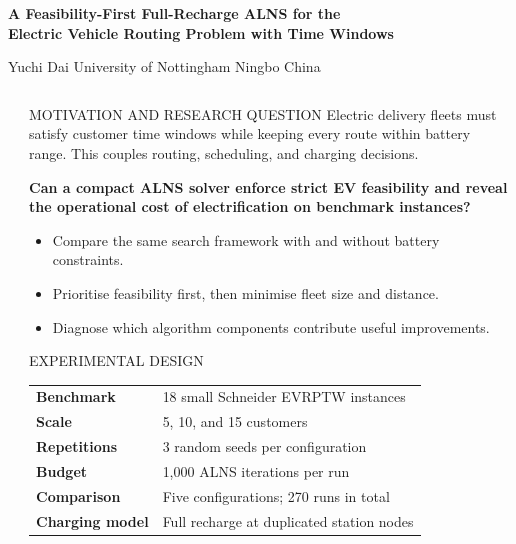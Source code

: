 \documentclass[final]{beamer}
\title{}
\author{}
\institute[]{}
\newlength{\sepwidth}
\newlength{\colwidth}
\newcommand{\separatorcolumn}{\begin{column}{\sepwidth}\end{column}}
\begin{document}
\begin{frame}[t]

{\centering
  \vspace{0.55cm}
  {\fontsize{50}{58}\selectfont\bfseries\color{nottblue}
  A Feasibility-First Full-Recharge ALNS for the\\
  Electric Vehicle Routing Problem with Time Windows\par}
  \vspace{0.35cm}
  {\fontsize{25}{31}\selectfont Yuchi Dai \quad\textbullet\quad University of Nottingham Ningbo China\par}
  \vspace{0.7cm}
}

\begin{columns}[t,totalwidth=\paperwidth]
\separatorcolumn

\begin{column}{\colwidth}

\begin{posterbox}{MOTIVATION AND RESEARCH QUESTION}
\fontsize{25}{32}\selectfont
Electric delivery fleets must satisfy customer time windows while keeping every route within battery range. This couples routing, scheduling, and charging decisions.

\vspace{0.3cm}
\begin{takeaway}
\centering\bfseries
Can a compact ALNS solver enforce strict EV feasibility and reveal the operational cost of electrification on benchmark instances?
\end{takeaway}

\vspace{0.25cm}
\begin{itemize}
  \item Compare the same search framework with and without battery constraints.
  \item Prioritise feasibility first, then minimise fleet size and distance.
  \item Diagnose which algorithm components contribute useful improvements.
\end{itemize}
\end{posterbox}

\begin{posterbox}{EXPERIMENTAL DESIGN}
\fontsize{23}{29}\selectfont
\begin{tabularx}{\linewidth}{>{\bfseries}l X}
Benchmark & 18 small Schneider EVRPTW instances\\
Scale & 5, 10, and 15 customers\\
Repetitions & 3 random seeds per configuration\\
Budget & 1,000 ALNS iterations per run\\
Comparison & Five configurations; 270 runs in total\\
Charging model & Full recharge at duplicated station nodes\\
\end{tabularx}


\end{posterbox}
\end{column}
\end{columns}
\end{frame}
\end{document}
